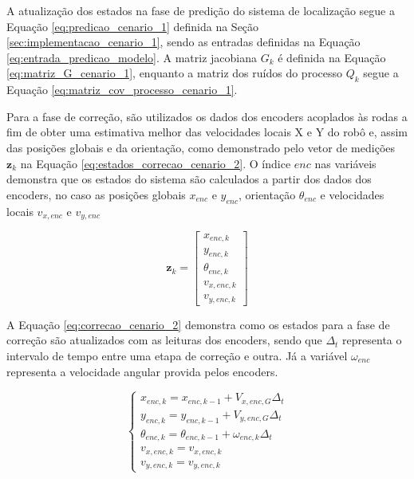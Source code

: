 \documentclass[acronym, symbols, table, deposito]{fei}
\begin{document}
			A atualização dos estados na fase de predição do sistema de localização segue a Equação \eqref{eq:predicao_cenario_1} definida na Seção \ref{sec:implementacao_cenario_1}, sendo as entradas definidas na Equação \eqref{eq:entrada_predicao_modelo}. A matriz jacobiana $G_k$ é definida na Equação \eqref{eq:matriz_G_cenario_1}, enquanto a matriz dos ruídos do processo $Q_k$ segue a Equação \eqref{eq:matriz_cov_processo_cenario_1}.
			
			Para a fase de correção, são utilizados os dados dos encoders acoplados às rodas a fim de obter uma estimativa melhor das velocidades locais X e Y do robô e, assim das posições globais e da orientação, como demonstrado pelo vetor de medições $\textbf{z}_k$ na Equação \eqref{eq:estados_correcao_cenario_2}. O índice $enc$ nas variáveis demonstra que os estados do sistema são calculados a partir dos dados dos encoders, no caso as posições globais $x_{enc}$ e $y_{enc}$, orientação $\theta_{enc}$ e velocidades locais $v_{x,enc}$ e $v_{y,enc}$
			
	 		\begin{equation}\label{eq:estados_correcao_cenario_2}
				\textbf{z}_k  = 
				\begin{bmatrix}
					x_{enc,k} \\
					y_{enc,k} \\
					\theta_{enc,k} \\
					v_{x,enc,k} \\
					v_{y,enc,k}
				\end{bmatrix}
			\end{equation}
		
			A Equação \eqref{eq:correcao_cenario_2} demonstra como os estados para a fase de correção são atualizados com as leituras dos encoders, sendo que $\Delta_t$ representa o intervalo de tempo entre uma etapa de correção e outra. Já a variável $\omega_{enc}$ representa a velocidade angular provida pelos encoders.
			
			\begin{equation}\label{eq:correcao_cenario_2}
				\begin{cases}
					x_{enc,k} = x_{enc,k-1} + V_{x,enc,G} \Delta_t \\
					y_{enc,k} = y_{enc,k-1} + V_{y,enc,G} \Delta_t  \\
					\theta_{enc,k} = \theta_{enc,k-1} + \omega_{enc,k} \Delta_t \\
					v_{x,enc,k} = v_{x,enc,k}\\
					v_{y,enc,k} = v_{y,enc,k}
				\end{cases}
			\end{equation}
			
\end{document}
